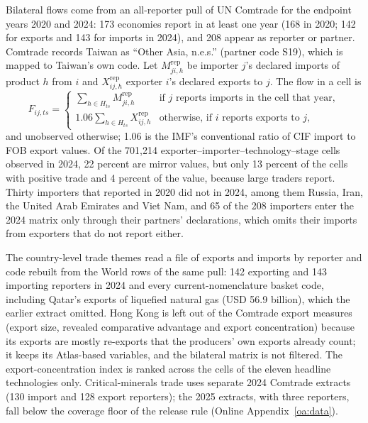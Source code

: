 Bilateral flows come from an all-reporter pull of UN Comtrade \citep{uncomtrade} for the
endpoint years 2020 and 2024: 173 economies report in at least one year (168 in 2020; 142 for
exports and 143 for imports in 2024), and 208 appear as reporter or partner. Comtrade records
Taiwan as ``Other Asia, n.e.s.'' (partner code S19), which is mapped to Taiwan's own code. Let
$M^{\mathrm{rep}}_{ji,h}$ be importer $j$'s declared imports of product $h$ from $i$ and
$X^{\mathrm{rep}}_{ij,h}$ exporter $i$'s declared exports to $j$. The flow in a cell is
\begin{equation}\label{eq:data_mirror}
  F_{ij,ts}=
  \begin{cases}
    \sum_{h\in H_{ts}}M^{\mathrm{rep}}_{ji,h} & \text{if $j$ reports imports in the cell that year},\\
    1.06\sum_{h\in H_{ts}}X^{\mathrm{rep}}_{ij,h} & \text{otherwise, if $i$ reports exports to $j$},
  \end{cases}
\end{equation}
and unobserved otherwise; 1.06 is the IMF's conventional ratio of CIF import to FOB export values.
Of the 701,214 exporter--importer--technology--stage cells observed in 2024, 22 percent are
mirror values, but only 13 percent of the cells with positive trade and 4 percent of the value,
because large traders report. Thirty importers that reported in 2020 did not in 2024, among them
Russia, Iran, the United Arab Emirates and Viet Nam, and 65 of the 208 importers enter the 2024
matrix only through their partners' declarations, which omits their imports from exporters that
do not report either.

The country-level trade themes read a file of exports and imports by reporter and code rebuilt
from the World rows of the same pull: 142 exporting and 143 importing reporters in 2024 and every
current-nomenclature basket code, including Qatar's exports of liquefied natural gas (USD 56.9
billion), which the earlier extract omitted. Hong Kong is left out of the Comtrade export measures
(export size, revealed comparative advantage \citep{balassa1965trade} and export concentration)
because its exports are mostly re-exports that the producers' own exports already count; it keeps
its Atlas-based variables, and the bilateral matrix is not filtered. The export-concentration
index is ranked across the cells of the eleven headline technologies only. Critical-minerals
trade uses separate 2024 Comtrade extracts (130 import and 128 export reporters); the 2025
extracts, with three reporters, fall below the coverage floor of the release rule (Online
Appendix~\ref{oa:data}).

